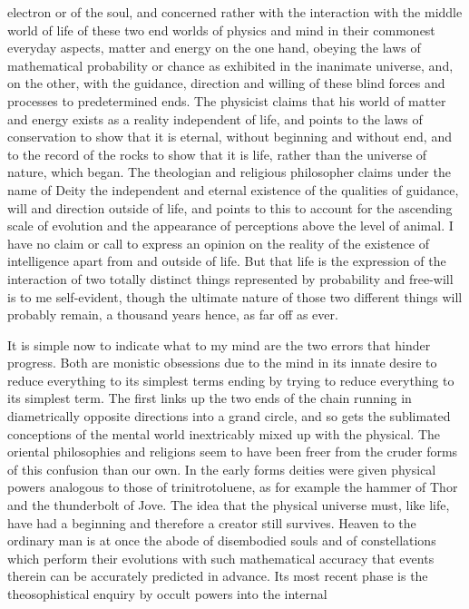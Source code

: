 \documentclass[10.5pt,twoside]{book}
\newcommand{\origpage}[1]{\clearpage\setcounter{page}{#1}}
\begin{document}
\origpage{6}

\noindent electron or of the soul, and concerned rather with the interaction
with the middle world of life of these two end worlds of physics and mind in
their commonest everyday aspects, matter and energy on the one hand, obeying
the laws of mathematical probability or chance as exhibited in the inanimate
universe, and, on the other, with the guidance, direction and willing of these
blind forces and processes to predetermined ends. The physicist claims that
his world of matter and energy exists as a reality independent of life, and
points to the laws of conservation to show that it is eternal, without
beginning and without end, and to the record of the rocks to show that it is
life, rather than the universe of nature, which began. The theologian and
religious philosopher claims under the name of Deity the independent and
eternal existence of the qualities of guidance, will and direction outside of
life, and points to this to account for the ascending scale of evolution and
the appearance of perceptions above the level of animal. I have no claim or
call to express an opinion on the reality of the existence of intelligence
apart from and outside of life. But that life is the expression of the
interaction of two totally distinct things represented by probability and
free-will is to me self-evident, though the ultimate nature of those two
different things will probably remain, a thousand years hence, as far off as
ever.

It is simple now to indicate what to my mind are the two errors that hinder
progress. Both are monistic obsessions due to the mind in its innate desire to
reduce everything to its simplest terms ending by trying to reduce everything
to its simplest term. The first links up the two ends of the chain running in
diametrically opposite directions into a grand circle, and so gets the
sublimated conceptions of the mental world inextricably mixed up with the
physical. The oriental philosophies and religions seem to have been freer from
the cruder forms of this confusion than our own. In the early forms deities
were given physical powers analogous to those of trinitrotoluene, as for
example the hammer of Thor and the thunderbolt of Jove. The idea that the
physical universe must, like life, have had a beginning and therefore a
creator still survives. Heaven to the ordinary man is at once the abode of
disembodied souls and of constellations which perform their evolutions with
such mathematical accuracy that events therein can be accurately predicted in
advance. Its most recent phase is the theosophistical enquiry by occult powers
into the internal
\end{document}

